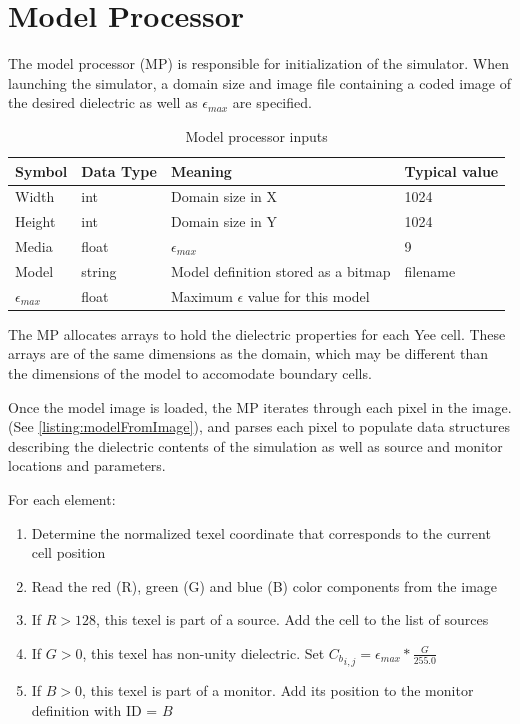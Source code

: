 \section{Model Processor}\label{sec:modelProcessor}

The model processor (MP) is responsible for initialization of the simulator. When launching the simulator, a domain size and image file containing a coded image of the desired dielectric as well as $\epsilon_{max}$ are specified.

\begin{table}[h!]
	\centering
	\caption{Model processor inputs}
	\label{tab:modelProcessorInputs}
	\begin{tabular}{l | l | l | l}
		Symbol	& Data Type & Meaning & Typical value				\\
		\hline														
		Width	& int 		& Domain size in X & 1024				\\
		Height	& int 		& Domain size in Y & 1024				\\
		Media	& float 	& $\epsilon_{max}$ & 9						\\
		Model	& string	& Model definition stored as a bitmap & filename \\
		$\epsilon_{max}$ & float & Maximum $\epsilon$ value for this model
	\end{tabular}
\end{table}

The MP allocates arrays to hold the dielectric properties for each Yee cell. These arrays are of the same dimensions as the domain, which may be different than the dimensions of the model to accomodate boundary cells.

Once the model image is loaded, the MP iterates through each pixel in the image. (See \autoref{listing:modelFromImage}), and parses each pixel to populate data structures describing the dielectric contents of the simulation as well as source and monitor locations and parameters.

For each element:

\begin{enumerate}
	\item Determine the normalized texel coordinate that corresponds to the current cell position	
	\item Read the red (R), green (G) and blue (B) color components from the image
	\item If $R > 128$, this texel is part of a source. Add the cell to the list of sources
	\item If $G > 0$, this texel has non-unity dielectric. Set ${C_b}_{i,j} = \epsilon_{max} * \frac{G}{255.0}$
	\item If $B > 0$, this texel is part of a monitor. Add its position to the monitor definition with ID = $B$
\end{enumerate}

